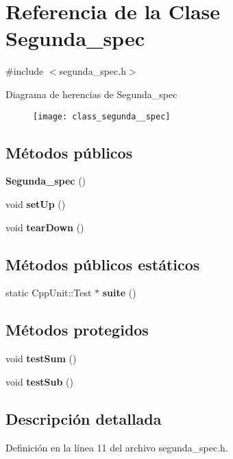 \section{Referencia de la Clase Segunda\+\_\+spec}
\label{class_segunda__spec}


{\ttfamily \#include $<$segunda\+\_\+spec.\+h$>$}

Diagrama de herencias de Segunda\+\_\+spec\begin{figure}[H]
\begin{center}
\leavevmode
\texttt{[image: class\_segunda\_\_spec]}
\end{center}
\end{figure}
\subsection*{Métodos públicos}
\begin{DoxyCompactItemize}
\item 
{\bf Segunda\+\_\+spec} ()
\item 
void {\bf set\+Up} ()
\item 
void {\bf tear\+Down} ()
\end{DoxyCompactItemize}
\subsection*{Métodos públicos estáticos}
\begin{DoxyCompactItemize}
\item 
static Cpp\+Unit\+::\+Test $\ast$ {\bf suite} ()
\end{DoxyCompactItemize}
\subsection*{Métodos protegidos}
\begin{DoxyCompactItemize}
\item 
void {\bf test\+Sum} ()
\item 
void {\bf test\+Sub} ()
\end{DoxyCompactItemize}


\subsection{Descripción detallada}


Definición en la línea 11 del archivo segunda\+\_\+spec.\+h.




